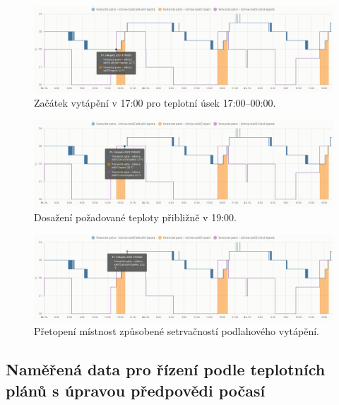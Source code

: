 \begin{figure}[H]
    \centering
    \includegraphics[width=\textwidth]{images/testovani/teplotni-plany/loznice-rodicu-termostat-zacatek-vytapeni.png}
    \caption{Začátek vytápění v 17:00 pro teplotní úsek 17:00–00:00.}
    \label{fig:loznice-rodicu-termostat-zacatek-vytapeni}
\end{figure}

\begin{figure}[H]
    \centering
    \includegraphics[width=\textwidth]{images/testovani/teplotni-plany/loznice-rodicu-termostat-konec-vytepeni.png}
    \caption{Dosažení požadované teploty přibližně v 19:00.}
    \label{fig:loznice-rodicu-termostat-konec-vytepeni}
\end{figure}

\begin{figure}[H]
    \centering
    \includegraphics[width=\textwidth]{images/testovani/teplotni-plany/loznice-rodicu-termostat-presazeni-teploty.png}
    \caption{Přetopení místnost způsobené setrvačností podlahového vytápění.}
    \label{fig:loznice-rodicu-termostat-presazeni-teploty}
\end{figure}

\subsection{Naměřená data pro řízení podle teplotních plánů s úpravou předpovědi počasí}